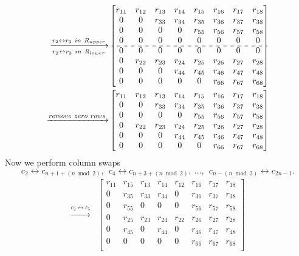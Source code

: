 \documentclass[12pt]{article}
\numberwithin{equation}{section}
\begin{document}
\begin{align*}
\xrightarrow[r_{2} \leftrightarrow r_{3}\ in\ R_{lower}]{r_{2} \leftrightarrow r_{3}\ in\ R_{upper}}
&\begin{bmatrix}
 r_{11} & r_{12} & r_{13} & r_{14} & r_{15} & r_{16} & r_{17} & r_{18}\\
 0      & 0      & r_{33} & r_{34} & r_{35} & r_{36} & r_{37} & r_{38}\\
 0      & 0      & 0      & 0      & r_{55} & r_{56} & r_{57} & r_{58}\\
 0      & 0      & 0      & 0      & 0      & 0      &  0     & 0     \\
\cdashline{1-8}
 0      & 0      & 0      & 0      & 0      & 0      & 0      & 0     \\
 0      & r_{22} & r_{23} & r_{24} & r_{25} & r_{26} & r_{27} & r_{28}\\
 0      & 0      & 0      & r_{44} & r_{45} & r_{46} & r_{47} & r_{48}\\
 0      & 0      & 0      & 0      & 0      & r_{66} & r_{67} & r_{68}\\
\end{bmatrix}\\
\xrightarrow{remove\ zero\ rows}
&\begin{bmatrix}
 r_{11} & r_{12} & r_{13} & r_{14} & r_{15} & r_{16} & r_{17} & r_{18}\\
 0      & 0      & r_{33} & r_{34} & r_{35} & r_{36} & r_{37} & r_{38}\\
 0      & 0      & 0      & 0      & r_{55} & r_{56} & r_{57} & r_{58}\\
 0      & r_{22} & r_{23} & r_{24} & r_{25} & r_{26} & r_{27} & r_{28}\\
 0      & 0      & 0      & r_{44} & r_{45} & r_{46} & r_{47} & r_{48}\\
 0      & 0      & 0      & 0      & 0      & r_{66} & r_{67} & r_{68}\\
\end{bmatrix}
\end{align*}
Now we perform column swaps \begin{equation}\label{cswap}
c_2\longleftrightarrow c_{n +1 + (n \bmod 2)}, \ \  c_4\longleftrightarrow c_{n+3+(n \bmod 2)}, \ \dots, \ \   c_{n - (n \bmod 2)}   \longleftrightarrow c_{2n-1}.
\end{equation}
\begin{align*}
\xrightarrow{c_{2} \leftrightarrow c_{5}}
&\begin{bmatrix}
 r_{11} & r_{15} & r_{13} & r_{14} &  r_{12} & r_{16} & r_{17} & r_{18}\\
 0      & r_{35} & r_{33} & r_{34} &  0      & r_{36} & r_{37} & r_{38}\\
 0      & r_{55} & 0      & 0      &  0      & r_{56} & r_{57} & r_{58}\\
 0      & r_{25} & r_{23} & r_{24} &  r_{22} & r_{26} & r_{27} & r_{28}\\
 0      & r_{45} & 0      & r_{44} &  0      & r_{46} & r_{47} & r_{48}\\
 0      & 0      & 0      & 0      &  0      & r_{66} & r_{67} & r_{68}\\
\end{bmatrix}
\end{align*}
\end{document}

